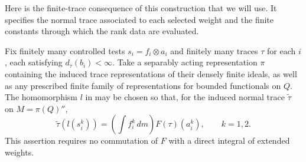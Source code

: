 Here is the finite-trace consequence of this construction that we will
use.  It specifies the normal trace associated to each selected weight
and the finite constants through which the rank data are evaluated.

\begin{lemma}\label{tc:finite-trace-realization}
Fix finitely many controlled tests $s_i=f_i\otimes a_i$ and finitely
many traces $\tau$ for each $i$, each satisfying $d_\tau(b_i)<\infty$.
Take a separably acting representation $\pi$ containing the induced
trace representations of their densely finite ideals, as well as any
prescribed finite family of representations for bounded functionals
on $Q$.  The homomorphism $l$ in  may
be chosen so that, for the induced normal trace $\widetilde\tau$ on
$M=\pi(Q)''$,
\begin{equation}\label{tc:finite-values}
 \widetilde\tau(l(s_i^k))
   =\left(\int f_i^k\,dm\right)F(\tau)(a_i^k),\qquad k=1,2.
\end{equation}
This assertion requires no commutation of $F$ with a direct integral
of extended weights.
\end{lemma}

